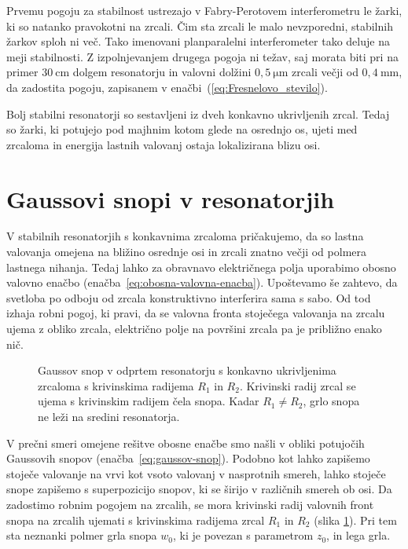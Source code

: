 Prvemu pogoju za stabilnost ustrezajo v Fabry-Perotovem interferometru
le žarki, ki so natanko pravokotni na zrcali. Čim sta zrcali le
malo nevzporedni, stabilnih žarkov sploh ni več. Tako imenovani 
planparalelni interferometer tako deluje 
na meji stabilnosti. Z izpolnjevanjem drugega
pogoja ni težav, saj morata biti pri na primer $30~\si{\centi\metre}$ dolgem resonatorju in 
valovni dolžini $0,5~\si{\micro\metre}$ zrcali večji od $0,4~\si{\milli\metre}$, da zadostita pogoju, 
zapisanem v enačbi~(\ref{eq:Fresnelovo_stevilo}).

Bolj stabilni resonatorji so sestavljeni iz dveh konkavno ukrivljenih
zrcal. Tedaj so žarki, ki potujejo pod majhnim kotom glede na osrednjo os, ujeti
med zrcaloma in energija lastnih valovanj ostaja lokalizirana blizu
osi.

\section{Gaussovi snopi v resonatorjih}
V stabilnih resonatorjih s konkavnima zrcaloma pričakujemo, da so
lastna valovanja omejena na bližino osrednje osi in zrcali znatno 
večji od polmera lastnega nihanja. Tedaj lahko za obravnavo
električnega polja uporabimo obosno valovno 
enačbo (enačba~\ref{eq:obosna-valovna-enacba}). Upoštevamo še zahtevo,
da svetloba po odboju od zrcala konstruktivno interferira sama s sabo.
Od tod izhaja robni pogoj, ki pravi, da se valovna fronta stoječega valovanja na 
zrcalu ujema z obliko zrcala, električno polje na površini zrcala
pa je približno enako nič.

\begin{figure}[h]
\centering
\def\svgwidth{100truemm} 

\caption{Gaussov snop v odprtem resonatorju s konkavno ukrivljenima zrcaloma
s krivinskima radijema $R_1$ in $R_2$. 
Krivinski radij zrcal se ujema s krivinskim radijem čela snopa. Kadar $R_1 \neq R_2$, 
grlo snopa ne leži na sredini resonatorja.}
\label{fig:Gaussov-snop-v-resonatorju}
\end{figure}

V prečni smeri omejene rešitve obosne enačbe smo našli v obliki potujočih
Gaussovih snopov (enačba~\ref{eq:gaussov-snop}). 
Podobno kot lahko zapišemo stoječe valovanje na vrvi kot
vsoto valovanj v nasprotnih smereh,
lahko stoječe snope zapišemo s superpozicijo snopov, ki se širijo v različnih smereh ob osi. 
Da zadostimo robnim pogojem na zrcalih, se mora krivinski radij valovnih front snopa na zrcalih ujemati s krivinskima radijema zrcal $R_{1}$ in $R_{2}$ 
(slika \ref{fig:Gaussov-snop-v-resonatorju}).
Pri tem sta neznanki polmer grla snopa $w_0$, ki je povezan s parametrom $z_{0}$,
in lega grla. 

